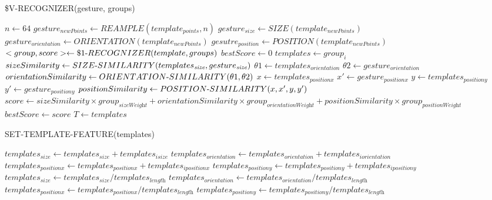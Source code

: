 \begin{algorithm}
  \caption*{\$V-RECOGNIZER(gesture, groups)}
  \begin{algorithmic}[1]
  \State $n\gets 64$
  \State $gesture_\textit{newPoints} \gets REAMPLE(template_\textit{points}, n)$ 
  \State $gesture_\textit{size}\gets SIZE(template_\textit{newPoints})$
  \State $gesture_\textit{orientation}\gets ORIENTATION(template_\textit{newPoints})$
  \State $gesutre_\textit{position}\gets POSITION(template_\textit{newPoints})$
  \State $<group, score>\gets \$1\mathchar`-RECOGNIZER(template, groups)$
  \State $bestScore\gets 0$
    	\State $templates\gets group_\textit{i}$
	\State $sizeSimilarity\gets SIZE\mathchar`-SIMILARITY(templates_\textit{size}, gesture_\textit{size})$
	\State $\theta 1\gets templates_\textit{orientation}$
	\State $\theta 2\gets gesture_\textit{orientation}$
	\State $orientationSimilarity\gets ORIENTATION\mathchar`-SIMILARITY(\theta 1, \theta 2)$
	\State $x\gets templates_\textit{positionx}$
	\State $x'\gets gesture_\textit{positionx}$
	\State $y\gets templates_\textit{positiony}$
	\State $y'\gets gesture_\textit{positiony}$
	\State $positionSimilarity\gets POSITION\mathchar`-SIMILARITY(x, x', y, y')$
	\State $score\gets sizeSimilarity\times group_\textit{sizeWeight} + orientationSimilarity\times group_\textit{orientationWeight} + positionSimilarity\times group_\textit{positionWeight}$
		\State $bestScore\gets score$
		\State $T\gets templates$
	\EndIf
  \EndFor
\end{algorithmic}
\end{algorithm}


\begin{algorithm}
  \caption*{SET-TEMPLATE-FEATURE(templates)}
  \begin{algorithmic}[1]
  \State $templates_\textit{size}\gets templates_\textit{size} + templates_\textit{isize}$
  \State $templates_\textit{orientation}\gets templates_\textit{orientation} + templates_\textit{iorientation}$
  \State $templates_\textit{positionx}\gets templates_\textit{positionx} + templates_\textit{ipositionx}$
  \State $templates_\textit{positiony}\gets templates_\textit{positiony} + templates_\textit{ipositiony}$
  \EndFor
  \State $templates_\textit{size}\gets templates_\textit{size} / templates_\textit{length}$
  \State $templates_\textit{orientation}\gets templates_\textit{orientation} / templates_\textit{length}$
  \State $templates_\textit{positionx}\gets templates_\textit{positionx} / templates_\textit{length}$
  \State $templates_\textit{positiony}\gets templates_\textit{positiony} / templates_\textit{length}$
\end{algorithmic}
\end{algorithm}

